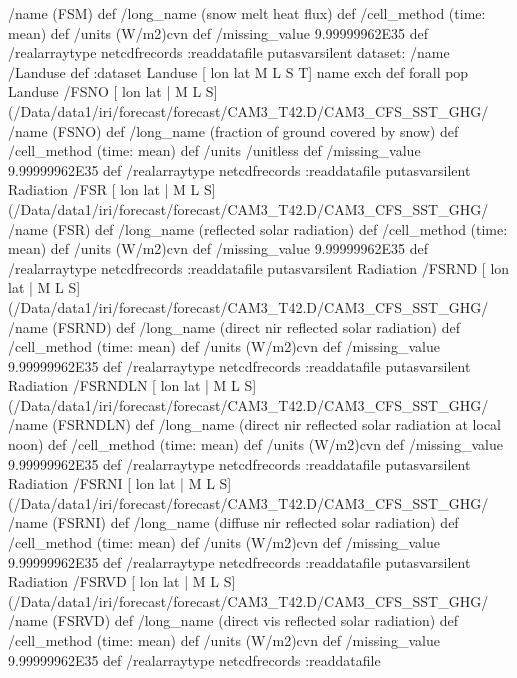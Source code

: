 \begin{ingrid}
{/name (FSM) def
 /long_name (snow melt heat flux) def
 /cell_method (time: mean) def
 /units (W/m2)cvn def
 /missing_value 9.99999962E35 def
 /realarraytype netcdfrecords :readdatafile
}putasvarsilent
dataset: /name /Landuse def :dataset
Landuse [ lon lat M L S T] {name exch def} forall pop
Landuse /FSNO{
[ lon lat | M L S] (/Data/data1/iri/forecast/forecast/CAM3_T42.D/CAM3_CFS_SST_GHG/%
/name (FSNO) def
 /long_name (fraction of ground covered by snow) def
 /cell_method (time: mean) def
 /units /unitless def
 /missing_value 9.99999962E35 def
 /realarraytype netcdfrecords :readdatafile
}putasvarsilent
Radiation /FSR{
[ lon lat | M L S] (/Data/data1/iri/forecast/forecast/CAM3_T42.D/CAM3_CFS_SST_GHG/%
/name (FSR) def
 /long_name (reflected solar radiation) def
 /cell_method (time: mean) def
 /units (W/m2)cvn def
 /missing_value 9.99999962E35 def
 /realarraytype netcdfrecords :readdatafile
}putasvarsilent
Radiation /FSRND{
[ lon lat | M L S] (/Data/data1/iri/forecast/forecast/CAM3_T42.D/CAM3_CFS_SST_GHG/%
/name (FSRND) def
 /long_name (direct nir reflected solar radiation) def
 /cell_method (time: mean) def
 /units (W/m2)cvn def
 /missing_value 9.99999962E35 def
 /realarraytype netcdfrecords :readdatafile
}putasvarsilent
Radiation /FSRNDLN{
[ lon lat | M L S] (/Data/data1/iri/forecast/forecast/CAM3_T42.D/CAM3_CFS_SST_GHG/%
/name (FSRNDLN) def
 /long_name (direct nir reflected solar radiation at local noon) def
 /cell_method (time: mean) def
 /units (W/m2)cvn def
 /missing_value 9.99999962E35 def
 /realarraytype netcdfrecords :readdatafile
}putasvarsilent
Radiation /FSRNI{
[ lon lat | M L S] (/Data/data1/iri/forecast/forecast/CAM3_T42.D/CAM3_CFS_SST_GHG/%
/name (FSRNI) def
 /long_name (diffuse nir reflected solar radiation) def
 /cell_method (time: mean) def
 /units (W/m2)cvn def
 /missing_value 9.99999962E35 def
 /realarraytype netcdfrecords :readdatafile
}putasvarsilent
Radiation /FSRVD{
[ lon lat | M L S] (/Data/data1/iri/forecast/forecast/CAM3_T42.D/CAM3_CFS_SST_GHG/%
/name (FSRVD) def
 /long_name (direct vis reflected solar radiation) def
 /cell_method (time: mean) def
 /units (W/m2)cvn def
 /missing_value 9.99999962E35 def
 /realarraytype netcdfrecords :readdatafile
}
\end{ingrid}
